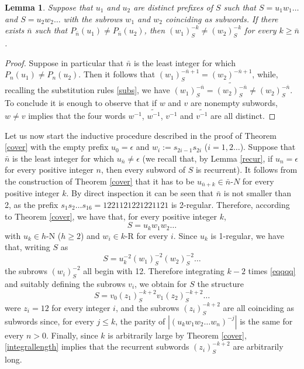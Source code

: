\documentclass[10pt,a4paper]{article}
\newtheorem{lemma}{Lemma}
\begin{document}
\begin{lemma}
Suppose that $u_1$ and $u_2$ are distinct prefixes of $S$ such that $S=u_1w_1\dots$ and $S=u_2w_2\dots$ with the subrows $w_1$ and $w_2$ coinciding as subwords. If there exists $\bar{n}$ such that $P_{\bar{n}}(u_1)\ne P_{\bar{n}}(u_2)$, then $(w_1)_S^{-k}\ne (w_2)_S^{-k}$ for every $k\ge \bar{n}$.  
\label{noname}
\end{lemma}
\begin{proof}
Suppose in particular that $\bar{n}$ is the least integer for which $P_n(u_1)\ne P_n(u_2)$. Then it follows that $(w_1)^{-\bar{n}+1}_S=(w_2)^{-\bar{n}+1}$, while, recalling the substitution rules \eqref{subs}, we have $(w_1)^{-\bar{n}}_S= \widetilde{(w_2)^{-\bar{n}}_S}\ne (w_2)^{-\bar{n}}_S$. To conclude it is enough to observe that if $w$ and $v$ are nonempty subwords, $w\ne v$ implies that the four words $w^{-1}$, $\widetilde{w^{-1}}$, $v^{-1}$ and $\widetilde{v^{-1}}$ are all distinct.
\end{proof}
 Let us now start the inductive procedure described in the proof of Theorem \ref{cover} with the empty prefix $u_0=\epsilon$ and $w_i:=s_{2i-1}s_{2i}$ ($i=1,2\dots$). Suppose that $\bar{n}$ is the least integer for which $u_{\bar{n}}\ne \epsilon$ (we recall that, by Lemma \ref{recur}, if $u_n=\epsilon$ for every positive integer $n$, then every subword of $S$ is recurrent). It follows from the construction of Theorem \ref{cover} that it has to be $u_{\bar{n}+k}\in\bar{n}\text{-}N$ for every positive integer $k$. By direct inspection it can be seen that $\bar{n}$ is not smaller than 2, as the prefix $s_1s_2\dots s_{16} = 12 21 12 12 21 22 11 21$ is 2-regular. Therefore, according to Theorem \ref{cover}, we have that, for every positive integer $k$, 
\begin{equation}
S=u_k w_1w_2\dots
\label{111}
\end{equation} 
 with $u_k\in h$-N ($h\ge 2$) and $w_i\in k$-R for every $i$. Since $u_k$ is 1-regular, we have that, writing $S$ as
\begin{equation}
S=u_{k}^{-2} (w_1)_S^{-2} (w_2)_S^{-2}\dots 
\label{eqqqq}
\end{equation}
the subrows $(w_i)_S^{-2}$ all begin with 12. Therefore integrating $k-2$ times \eqref{eqqqq} and suitably defining the subrows $v_i$, we obtain for $S$ the structure
\begin{equation*}
S=v_0(z_1)_S^{-k+2}v_1(z_2)_S^{-k+2}\dots
\end{equation*}
were $z_i=12$ for every integer $i$, and the subrows $(z_i)_S^{-k+2}$ are all coinciding as subwords since, for every $j\le k$, the parity of $|(u_kw_1w_2\dots w_n)^{-j}|$ is the same for every $n>0$. Finally, since $k$ is arbitrarily large by Theorem \ref{cover}, \eqref{integrallength} implies that the recurrent subwords $(z_i)_S^{-k+2}$ are arbitrarily long.
\end{document}
